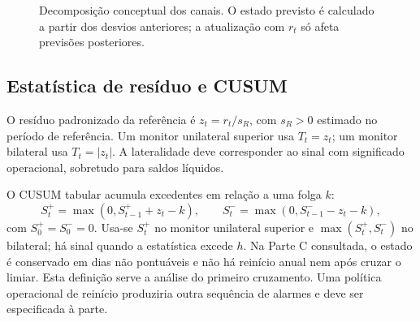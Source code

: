 \begin{figure}[htbp]
\centering
{}
\caption{Decomposição conceptual dos canais. O estado previsto é calculado a partir dos desvios anteriores; a atualização com $r_t$ só afeta previsões posteriores.}
\label{fig:mat-canais}
\end{figure}

\subsection{Estatística de resíduo e CUSUM}
\label{sec:mat-cusum}
O resíduo padronizado da referência é $z_t=r_t/s_R$, com $s_R>0$ estimado no período de referência. Um monitor unilateral superior usa $T_t=z_t$; um monitor bilateral usa $T_t=|z_t|$. A lateralidade deve corresponder ao sinal com significado operacional, sobretudo para saldos líquidos.

O CUSUM tabular acumula excedentes em relação a uma folga $k$\parencite{Page1954}:
\begin{equation}
S_t^+=\max(0,S_{t-1}^++z_t-k),
\qquad S_t^-=\max(0,S_{t-1}^--z_t-k),
\label{eq:mat-cusum}
\end{equation}
com $S_0^+=S_0^-=0$. Usa-se $S_t^+$ no monitor unilateral superior e $\max(S_t^+,S_t^-)$ no bilateral; há sinal quando a estatística excede $h$. Na Parte C consultada, o estado é conservado em dias não pontuáveis e não há reinício anual nem após cruzar o limiar. Esta definição serve a análise do primeiro cruzamento. Uma política operacional de reinício produziria outra sequência de alarmes e deve ser especificada à parte.

